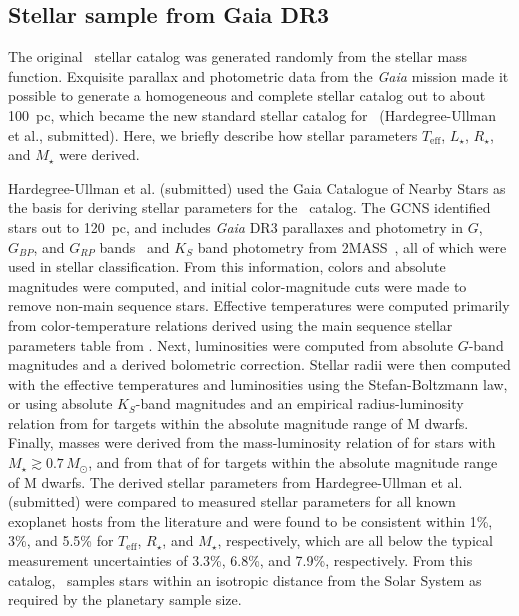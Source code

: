 \documentclass[twocolumn,twocolappendix]{aastex631}
\begin{document}
\subsection{Stellar sample from Gaia DR3}
The original \bioverse\ stellar catalog was generated randomly from the \citet{Chabrier2003} stellar mass function. Exquisite parallax and photometric data from the \textit{Gaia} mission made it possible to generate a homogeneous and complete stellar catalog out to about 100~pc, which became the new standard stellar catalog for \bioverse ~(Hardegree-Ullman et al., submitted). Here, we briefly describe how stellar parameters $T_{\mathrm{eff}}$, $L_{\star}$, $R_{\star}$, and $M_{\star}$ were derived.

Hardegree-Ullman et al. (submitted) used the Gaia Catalogue of Nearby Stars \citep[hereafter GCNS,][]{Smart2021} as the basis for deriving stellar parameters for the \bioverse\ catalog.
The GCNS identified stars out to 120~pc, and includes \textit{Gaia} DR3 parallaxes and photometry in $G$, $G_{BP}$, and $G_{RP}$ bands~\citep{GaiaCollaboration2021} and $K_S$ band photometry from 2MASS~\citep{Cutri2003}, all of which were used in stellar classification.
From this information, colors and absolute magnitudes were computed, and initial color-magnitude cuts were made to remove non-main sequence stars.
Effective temperatures were computed primarily from color-temperature relations derived using the main sequence stellar parameters table from \citet{Pecaut2013}.
Next, luminosities were computed from absolute $G$-band magnitudes and a derived bolometric correction.
Stellar radii were then computed with the effective temperatures and luminosities using the Stefan-Boltzmann law, or using absolute $K_S$-band magnitudes and an empirical radius-luminosity relation from \citet{Mann2015} for targets within the absolute magnitude range of M dwarfs.
Finally, masses were derived from the mass-luminosity relation of \citet{Torres2010} for stars with $M_{\star}\gtrsim 0.7\,M_{\odot}$, and from that of \citet{Mann2019} for targets within the absolute magnitude range of M dwarfs.
The derived stellar parameters from Hardegree-Ullman et al. (submitted) were compared to measured stellar parameters for all known exoplanet hosts from the literature and were found to be consistent within 1\%, 3\%, and 5.5\% for $T_{\mathrm{eff}}$, $R_{\star}$, and $M_{\star}$, respectively, which are all below the typical measurement uncertainties of 3.3\%, 6.8\%, and 7.9\%, respectively.
From this catalog, \bioverse\ samples stars within an isotropic distance from the Solar System as required by the planetary sample size.
\end{document}
